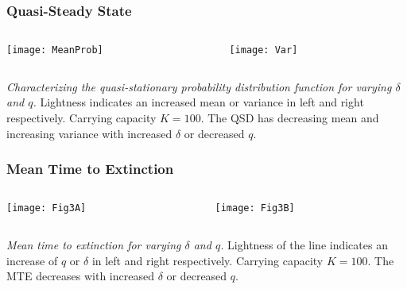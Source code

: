 \documentclass[dvipsnames]{beamer}
\begin{document}
\begin{frame}
\frametitle{Quasi-Steady State}
\begin{columns}
\begin{column}{5.5cm}
\begin{center}
\texttt{[image: MeanProb]}
\end{center}
\end{column}
\begin{column}{5.5cm}
\begin{center}
\texttt{[image: Var]}
\end{center}
\end{column}
\end{columns}
\justifying
\emph{Characterizing the quasi-stationary probability distribution function for varying $\delta$ and $q$.} 
Lightness indicates an increased mean or variance in left and right respectively. Carrying capacity $K=100$. 
The QSD has decreasing mean and increasing variance with increased $\delta$ or decreased $q$. 
\end{frame}


\begin{frame}
\frametitle{Mean Time to Extinction}
\begin{columns}
	\begin{column}{5.5cm}
		\begin{center}
			\texttt{[image: Fig3A]}
		\end{center}
	\end{column}
	\begin{column}{5.5cm}
		\begin{center}
			\texttt{[image: Fig3B]}
		\end{center}
	\end{column}
\end{columns}
\justifying
\emph{Mean time to extinction for varying $\delta$ and $q$.} 
Lightness of the line indicates an increase of $q$ or $\delta$ in left and right respectively. 
Carrying capacity $K=100$. 
The MTE decreases with increased $\delta$ or decreased $q$. 
\end{frame}
\end{document}
